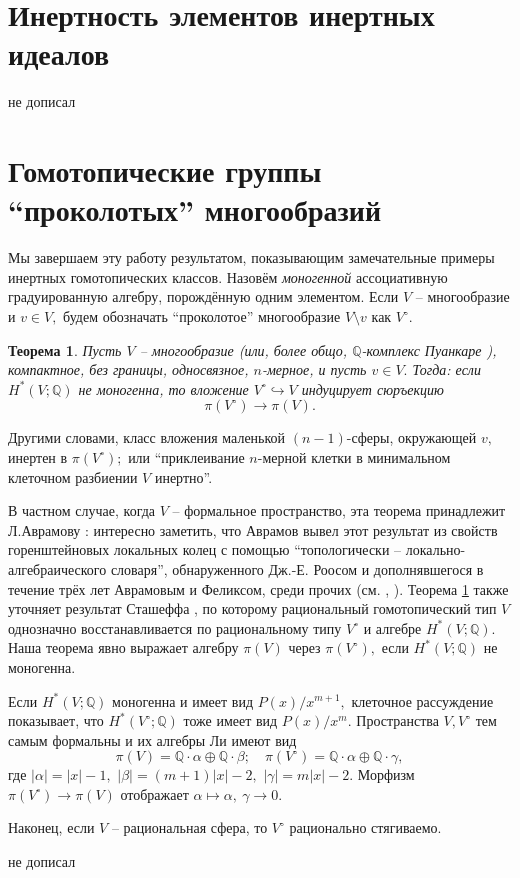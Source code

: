 \documentclass[10pt,a4paper]{article}
\def\QQ{\mathbb{Q}}
\newtheorem{thm}{Теорема}[section]
\theoremstyle{definition}
\begin{document}
\section{Инертность элементов инертных идеалов}\label{section:4}
{\color{red} не дописал}

\section{Гомотопические группы ``проколотых'' многообразий}\label{section:5}
Мы завершаем эту работу результатом, показывающим замечательные примеры инертных гомотопических классов. Назовём \emph{моногенной} ассоциативную градуированную алгебру, порождённую одним элементом. Если $V$ -- многообразие и $v\in V,$ будем обозначать ``проколотое'' многообразие $V\setminus v$ как $V^\circ.$

\begin{thm}\label{thm_5.1}
Пусть $V$ -- многообразие (или, более общо, $\QQ$-комплекс Пуанкаре \cite{6}), компактное, без границы, односвязное, $n$-мерное, и пусть $v\in V.$ Тогда: если $H^*(V;\QQ)$ не моногенна, то вложение $V^\circ\hookrightarrow V$ индуцирует сюръекцию
$$\pi(V^\circ)\to\pi(V).$$
\end{thm}
Другими словами, класс вложения маленькой $(n-1)$-сферы, окружающей $v,$ инертен в $\pi(V^\circ);$ или ``приклеивание $n$-мерной клетки в минимальном клеточном разбиении $V$ инертно''.

В частном случае, когда $V$ -- формальное пространство, эта теорема принадлежит Л.Аврамову \cite[теорема 7.5]{3}: интересно заметить, что Аврамов вывел этот результат из свойств горенштейновых локальных колец с помощью ``топологически -- локально-алгебраического словаря'', обнаруженного Дж.-Е. Роосом и дополнявшегося в течение трёх лет Аврамовым и Феликсом, среди прочих (см. \cite{3}, \cite{4}). Теорема \ref{thm_5.1} также уточняет результат Сташеффа \cite{19}, по которому рациональный гомотопический тип $V$ однозначно восстанавливается по рациональному типу $V^\circ$ и алгебре $H^*(V;\QQ).$ Наша теорема явно выражает алгебру $\pi(V)$ через $\pi(V^\circ),$ если $H^*(V;\QQ)$ не моногенна.

Если $H^*(V;\QQ)$ моногенна и имеет вид $P(x)/x^{m+1},$ клеточное рассуждение показывает, что $H^*(V^\circ;\QQ)$ тоже имеет вид $P(x)/x^m.$ Пространства $V,V^\circ$ тем самым формальны и их алгебры Ли имеют вид
$$\pi(V)=\QQ\cdot \alpha\oplus\QQ\cdot\beta;\quad \pi(V^\circ)=\QQ\cdot\alpha\oplus\QQ\cdot\gamma,$$ где $|\alpha|=|x|-1,$ $|\beta|=(m+1)|x|-2,$ $|\gamma|=m|x|-2.$ Морфизм $\pi(V^\circ)\to \pi(V)$ отображает $\alpha\mapsto\alpha,~\gamma\to 0.$ 

Наконец, если $V$ -- рациональная сфера, то $V^\circ$ рационально стягиваемо.

{\color{red} не дописал}



\end{document}
